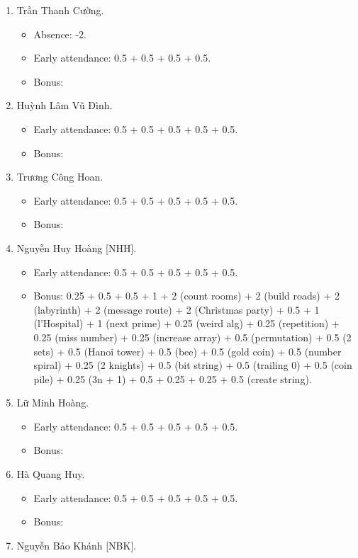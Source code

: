 \documentclass{article}
\begin{document}
\begin{enumerate}
	\item {\sc Trần Thanh Cường.}
	\begin{itemize}
		\item Absence: -2.
		\item Early attendance: 0.5 + 0.5 + 0.5 + 0.5.
		\item Bonus: 
	\end{itemize}
	\item {\sc Huỳnh Lâm Vũ Đình.}
	\begin{itemize}
		\item Early attendance: 0.5 + 0.5 + 0.5 + 0.5 + 0.5.
		\item Bonus: 
	\end{itemize}
	\item {\sc Trương Công Hoan.}
	\begin{itemize}
		\item Early attendance: 0.5 + 0.5 + 0.5 + 0.5 + 0.5.
		\item Bonus: 
	\end{itemize}
	\item {\sc Nguyễn Huy Hoàng [NHH].}
	\begin{itemize}
		\item Early attendance: 0.5 + 0.5 + 0.5 + 0.5 + 0.5.
		\item Bonus: 0.25 + 0.5 + 0.5 + 1 + 2 (count rooms) + 2 (build roads) + 2 (labyrinth) + 2 (message route) + 2 (Christmas party) + 0.5 + 1 (l'Hospital) + 1 (next prime) + 0.25 (weird alg) + 0.25 (repetition) + 0.25 (miss number) + 0.25 (increase array) + 0.5 (permutation) + 0.5 (2 sets) + 0.5 (Hanoi tower) + 0.5 (bee) + 0.5 (gold coin) + 0.5 (number spiral) + 0.25 (2 knights) + 0.5 (bit string) + 0.5 (trailing 0) + 0.5 (coin pile) + 0.25 (3n + 1) + 0.5 + 0.25 + 0.25 + 0.5 (create string).
	\end{itemize}
	\item {\sc Lữ Minh Hoàng.}
	\begin{itemize}
		\item Early attendance: 0.5 + 0.5 + 0.5 + 0.5 + 0.5.
		\item Bonus: 
	\end{itemize}
	\item {\sc Hà Quang Huy.}
	\begin{itemize}
		\item Early attendance: 0.5 + 0.5 + 0.5 + 0.5 + 0.5.
		\item Bonus: 
	\end{itemize}
	\item {\sc Nguyễn Bảo Khánh [NBK].}

\end{enumerate}
\end{document}
